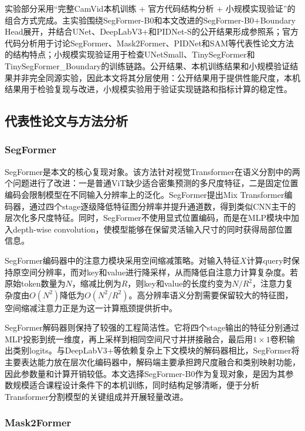 \documentclass{report}
\begin{document}
实验部分采用“完整CamVid本机训练 + 官方代码结构分析 + 小规模实现验证”的组合方式完成。主实验围绕SegFormer-B0和本文改进的SegFormer-B0+Boundary Head展开，并结合UNet、DeepLabV3+和PIDNet-S的公开结果形成参照系；官方代码分析用于讨论SegFormer、Mask2Former、PIDNet和SAM等代表性论文方法的结构特点；小规模实现验证用于检查UNetSmall、TinySegFormer和TinySegFormer\_Boundary的训练链路。公开结果、本机训练结果和小规模验证结果并非完全同源实验，因此本文将其分层使用：公开结果用于提供性能尺度，本机结果用于检验复现与改进，小规模实验用于验证实现链路和指标计算的稳定性。

\subsection{代表性论文与方法分析}

\subsubsection{SegFormer}

SegFormer是本文的核心复现对象。该方法针对视觉Transformer在语义分割中的两个问题进行了改进：一是普通ViT缺少适合密集预测的多尺度特征，二是固定位置编码会限制模型在不同输入分辨率上的泛化。SegFormer提出Mix Transformer编码器，通过四个stage逐级降低特征图分辨率并提升通道数，得到类似CNN主干的层次化多尺度特征。同时，SegFormer不使用显式位置编码，而是在MLP模块中加入depth-wise convolution，使模型能够在保留灵活输入尺寸的同时获得局部位置信息。

SegFormer编码器中的注意力模块采用空间缩减策略。对输入特征$X$计算query时保持原空间分辨率，而对key和value进行降采样，从而降低自注意力计算复杂度。若原始token数量为$N$，缩减比例为$R$，则key和value的长度约变为$N/R^2$，注意力复杂度由$O(N^2)$降低为$O(N^2/R^2)$。高分辨率语义分割需要保留较大的特征图，空间缩减注意力正是为这一计算瓶颈提供折中。

SegFormer解码器则保持了较强的工程简洁性。它将四个stage输出的特征分别通过MLP投影到统一维度，再上采样到相同空间尺寸并拼接融合，最后用$1 \times 1$卷积输出类别logits。与DeepLabV3+等依赖复杂上下文模块的解码器相比，SegFormer将主要表达能力放在层次化编码器中，解码端主要承担跨尺度融合和类别映射功能，因此参数量和计算开销较低。本文选择SegFormer-B0作为复现对象，是因为其参数规模适合课程设计条件下的本机训练，同时结构足够清晰，便于分析Transformer分割模型的关键组成并开展轻量改进。

\subsubsection{Mask2Former}
\end{document}
